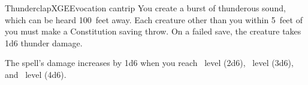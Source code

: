 \begin{spell}{Thunderclap}{XGE}{Evocation cantrip}
{
}
You create a burst of thunderous sound, which can be heard
100~feet away. Each creature other than you within 5~feet
of you must make a Constitution saving throw. On a failed
save, the creature takes 1d6 thunder damage.

 The spell's damage increases by 1d6
when you reach ~level (2d6), ~level (3d6),
and ~level (4d6).
\end{spell}